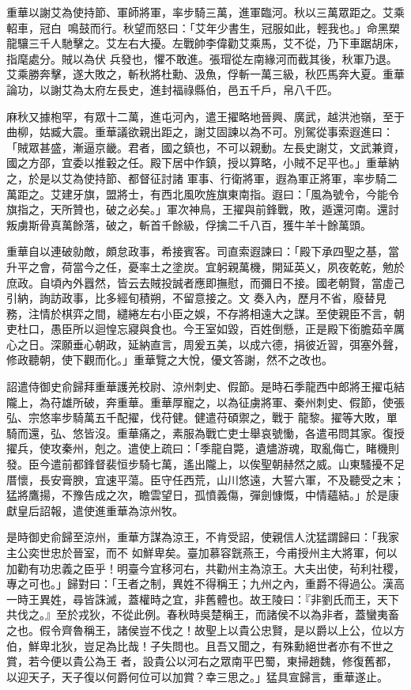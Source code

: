 \begin{pinyinscope}
 重華以謝艾為使持節、軍師將軍，率步騎三萬，進軍臨河。秋以三萬眾距之。艾乘軺車，冠白，鳴鼓而行。秋望而怒曰：「艾年少書生，冠服如此，輕我也。」命黑槊龍驤三千人馳擊之。艾左右大擾。左戰帥李偉勸艾乘馬，艾不從，乃下車踞胡床，指麾處分。賊以為伏
 兵發也，懼不敢進。張瑁從左南緣河而截其後，秋軍乃退。艾乘勝奔擊，遂大敗之，斬秋將杜勳、汲魚，俘斬一萬三級，秋匹馬奔大夏。重華論功，以謝艾為太府左長史，進封福祿縣伯，邑五千戶，帛八千匹。



 麻秋又據枹罕，有眾十二萬，進屯河內，遣王擢略地晉興、廣武，越洪池嶺，至于曲柳，姑臧大震。重華議欲親出距之，謝艾固諫以為不可。別駕從事索遐進曰：「賊眾甚盛，漸逼京畿。君者，國之鎮也，不可以親動。左長史謝艾，文武兼資，國之方邵，宜委以推轂之任。殿下居中作鎮，授以算略，小賊不足平也。」重華納之，於是以艾為使持節、都督征討諸
 軍事、行衛將軍，遐為軍正將軍，率步騎二萬距之。艾建牙旗，盟將士，有西北風吹旌旗東南指。遐曰：「風為號令，今能令旗指之，天所贊也，破之必矣。」軍次神鳥，王擢與前鋒戰，敗，遁還河南。還討叛虜斯骨真萬餘落，破之，斬首千餘級，俘擒二千八百，獲牛羊十餘萬頭。



 重華自以連破勍敵，頗怠政事，希接賓客。司直索遐諫曰：「殿下承四聖之基，當升平之會，荷當今之任，憂率土之塗炭。宜躬親萬機，開延英乂，夙夜乾乾，勉於庶政。自頃內外囂然，皆云去賊投誠者應即撫慰，而彌日不接。國老朝賢，當虛己引納，詢訪政事，比多經旬積朔，不留意接之。文
 奏入內，歷月不省，廢替見務，注情於棋弈之間，繾綣左右小臣之娛，不存將相遠大之謀。至使親臣不言，朝吏杜口，愚臣所以迴惶忘寢與食也。今王室如毀，百姓倒懸，正是殿下銜膽茹辛厲心之日。深願垂心朝政，延納直言，周爰五美，以成六德，捐彼近習，弭塞外聲，修政聽朝，使下觀而化。」重華覽之大悅，優文答謝，然不之改也。



 詔遣侍御史俞歸拜重華護羌校尉、涼州刺史、假節。是時石季龍西中郎將王擢屯結隴上，為苻雄所破，奔重華。重華厚寵之，以為征虜將軍、秦州刺史、假節，使張弘、宗悠率步騎萬五千配擢，伐苻健。健遣苻碩禦之，戰于
 龍黎。擢等大敗，單騎而還，弘、悠皆沒。重華痛之，素服為戰亡吏士舉哀號慟，各遣弔問其家。復授擢兵，使攻秦州，剋之。遣使上疏曰：「季龍自斃，遺燼游魂，取亂侮亡，睹機則發。臣今遣前都鋒督裴恒步騎七萬，遙出隴上，以俟聖朝赫然之威。山東騷擾不足厝懷，長安膏腴，宜速平蕩。臣守任西荒，山川悠遠，大誓六軍，不及聽受之末；猛將鷹揚，不豫告成之次，瞻雲望日，孤憤義傷，彈劍慷慨，中情蘊結。」於是康獻皇后詔報，遣使進重華為涼州牧。



 是時御史俞歸至涼州，重華方謀為涼王，不肯受詔，使親信人沈猛謂歸曰：「我家主公奕世忠於晉室，而不
 如鮮卑矣。臺加慕容皝燕王，今甫授州主大將軍，何以加勸有功忠義之臣乎！明臺今宜移河右，共勸州主為涼王。大夫出使，茍利社稷，專之可也。」歸對曰：「王者之制，異姓不得稱王；九州之內，重爵不得過公。漢高一時王異姓，尋皆誅滅，蓋權時之宜，非舊體也。故王陵曰：『非劉氏而王，天下共伐之。』至於戎狄，不從此例。春秋時吳楚稱王，而諸侯不以為非者，蓋蠻夷畜之也。假令齊魯稱王，諸侯豈不伐之！故聖上以貴公忠賢，是以爵以上公，位以方伯，鮮卑北狄，豈足為比哉！子失問也。且吾又聞之，有殊勳絕世者亦有不世之賞，若今便以貴公為王
 者，設貴公以河右之眾南平巴蜀，東掃趙魏，修復舊都，以迎天子，天子復以何爵何位可以加賞？幸三思之。」猛具宣歸言，重華遂止。




\end{pinyinscope}
